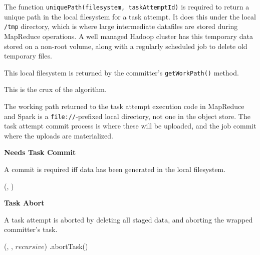 \documentclass[conference]{IEEEtran}
\begin{document}
The function \texttt{uniquePath(filesystem, taskAttemptId)} is required to return
a unique path in the local filesystem for a task attempt.
It does this under the local \texttt{/tmp} directory, which is where
large intermediate datafiles are stored during MapReduce operations.
A well managed Hadoop cluster has this temporary data stored on a non-root
volume, along with a regularly scheduled job to delete old temporary files.

This local filesystem is returned by the committer's \texttt{getWorkPath()} method.

\begin{function}
\StagingVars
  \return \localAttemptPath\;

\caption{StagingCommitter.getWorkPath()}
\label{alg:StagingCommitter.getWorkPath}
\end{function}

This is the crux of the algorithm.

The working path returned to the task attempt execution code in MapReduce and Spark
is a \texttt{file://}-prefixed local directory, not one in the object store.
The task attempt commit process is where these will be uploaded, and the job
commit where the uploads are materialized.

\textbf{Needs Task Commit}

A commit is required iff data has been generated in the local filesystem.

\begin{function}
  \StagingVars

  \return \exists(\localfs, \localAttemptPath)\;

  \caption{StagingCommitter.needsTaskCommit()}
  \label{alg:StagingCommitter.needsTaskCommit}

\end{function}


\textbf{Task Abort}

A task attempt is aborted by deleting all staged data, and aborting the wrapped committer's
task.

\begin{procedure}
\StagingVars

  \delete(\localfs, \localAttemptPath, $recursive$)\;
  \wrappedCommitter.abortTask()\;

\caption{StagingCommitter.abortTask()}
\label{alg:StagingCommitter.abortTask}
\end{procedure}
\end{document}
